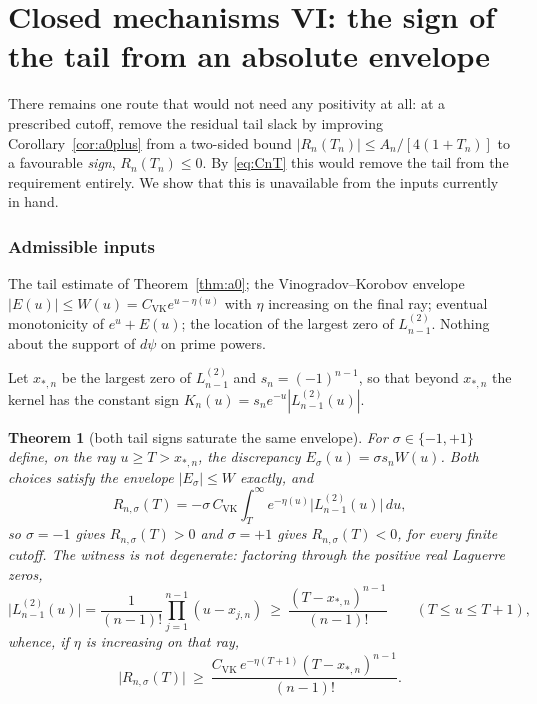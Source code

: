 \documentclass[11pt]{amsart}
\newtheorem{theorem}{Theorem}[section]
\theoremstyle{definition}
\theoremstyle{remark}
\theoremstyle{definition}
\begin{document}
\section{Closed mechanisms VI: the sign of the tail from an absolute envelope}
\label{sec:mech-envelope}

There remains one route that would not need any positivity at all: at a prescribed cutoff, remove
the residual tail slack by improving Corollary~\ref{cor:a0plus} from a two-sided bound
$|R_n(T_n)|\le A_n/[4(1+T_n)]$ to a favourable \emph{sign}, $R_n(T_n)\le0$. By \eqref{eq:CnT}
this would remove the tail from the requirement entirely. We show that this is unavailable from the
inputs currently in hand.

\subsubsection*{Admissible inputs}
The tail estimate of Theorem~\ref{thm:a0}; the Vinogradov--Korobov envelope $|E(u)|\le W(u)=C_{\mathrm{VK}}e^{u-\eta(u)}$ with
$\eta$ increasing on the final ray; eventual monotonicity of $e^u+E(u)$; the location of the
largest zero of $L^{(2)}_{n-1}$. Nothing about the support of $d\psi$ on prime powers.

Let $x_{*,n}$ be the largest zero of $L^{(2)}_{n-1}$ and $s_n=(-1)^{n-1}$, so that beyond
$x_{*,n}$ the kernel has the constant sign $K_n(u)=s_ne^{-u}|L^{(2)}_{n-1}(u)|$.

\begin{theorem}[both tail signs saturate the same envelope]\label{thm:tail}
For $\sigma\in\{-1,+1\}$ define, on the ray $u\ge T>x_{*,n}$, the discrepancy
$E_\sigma(u)=\sigma s_nW(u)$. Both choices satisfy the envelope $|E_\sigma|\le W$ exactly, and
\begin{equation}\label{eq:tail-signs}
   R_{n,\sigma}(T)=-\sigma\,C_{\mathrm{VK}}
   \int_T^\infty e^{-\eta(u)}\bigl|L^{(2)}_{n-1}(u)\bigr|\,du ,
\end{equation}
so $\sigma=-1$ gives $R_{n,\sigma}(T)>0$ and $\sigma=+1$ gives $R_{n,\sigma}(T)<0$, for every
finite cutoff. The witness is not degenerate: factoring through the positive real Laguerre zeros,
\begin{equation}\label{eq:tail-quant}
   \bigl|L^{(2)}_{n-1}(u)\bigr|=\frac{1}{(n-1)!}\prod_{j=1}^{n-1}(u-x_{j,n})
   \ \ge\ \frac{(T-x_{*,n})^{n-1}}{(n-1)!}\qquad(T\le u\le T+1),
\end{equation}
whence, if $\eta$ is increasing on that ray,
\begin{equation}\label{eq:tail-lower}
   \bigl|R_{n,\sigma}(T)\bigr|
   \ \ge\ \frac{C_{\mathrm{VK}}\,e^{-\eta(T+1)}(T-x_{*,n})^{n-1}}{(n-1)!} .
\end{equation}
\end{theorem}
\end{document}
